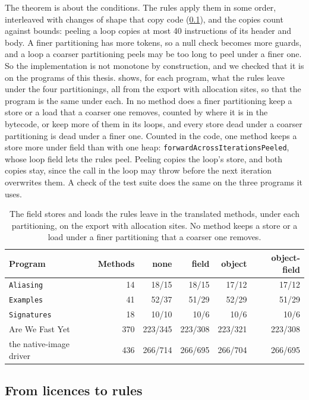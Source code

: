 The theorem is about the conditions. The rules apply them in some order,
interleaved with changes of shape that copy code (\cref{sec:ee-shape}), and the
copies count against bounds: peeling a loop copies at most 40 instructions of
its header and body. A finer partitioning has more tokens, so a null check
becomes more guards, and a loop a coarser partitioning peels may be too long to
peel under a finer one. So the implementation is not monotone by construction,
and we checked that it is on the programs of this thesis. 
shows, for each program, what the rules leave under the four partitionings,
all from the export with allocation sites, so that the program is the same
under each. In no method does a finer partitioning keep a store or a load that
a coarser one removes, counted by where it is in the bytecode, or keep more of
them in its loops, and every store dead under a coarser partitioning is dead
under a finer one. Counted in the code, one method keeps a store more under
field than with one heap: \texttt{forwardAcrossIterationsPeeled}, whose loop
field lets the rules peel. Peeling copies the loop's store, and both copies
stay, since the call in the loop may throw before the next iteration overwrites
them. A check of the test suite does the same on the three programs it uses.

\begin{table}[t]
\centering
\begin{tabular}{@{}lrrrrr@{}}
\toprule
Program & Methods & none & field & object & object-field \\
\midrule
\texttt{Aliasing} & 14 & 18/15 & 18/15 & 17/12 & 17/12 \\
\texttt{Examples} & 41 & 52/37 & 51/29 & 52/29 & 51/29 \\
\texttt{Signatures} & 18 & 10/10 & 10/6 & 10/6 & 10/6 \\
Are We Fast Yet & 370 & 223/345 & 223/308 & 223/321 & 223/308 \\
the native-image driver & 436 & 266/714 & 266/695 & 266/704 & 266/695 \\
\bottomrule
\end{tabular}
\caption{The field stores and loads the rules leave in the translated methods,
under each partitioning, on the export with allocation sites. No method keeps a
store or a load under a finer partitioning that a coarser one removes.}
\label{tab:ee-monotone}
\end{table}

\subsection{From licences to rules}\label{sec:ee-shape}

